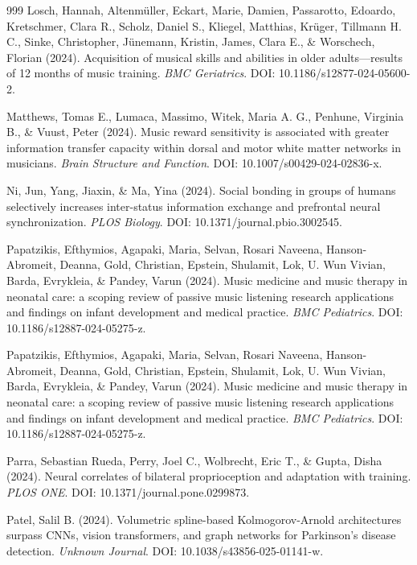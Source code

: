 \documentclass[9pt,onecolumn]{article}
\begin{document}
\begin{thebibliography}{999}
Losch, Hannah, Altenmüller, Eckart, Marie, Damien, Passarotto, Edoardo, Kretschmer, Clara R., Scholz, Daniel S., Kliegel, Matthias, Krüger, Tillmann H. C., Sinke, Christopher, Jünemann, Kristin, James, Clara E., \& Worschech, Florian (2024). Acquisition of musical skills and abilities in older adults—results of 12 months of music training. \textit{BMC Geriatrics}. DOI: 10.1186/s12877-024-05600-2.

Matthews, Tomas E., Lumaca, Massimo, Witek, Maria A. G., Penhune, Virginia B., \& Vuust, Peter (2024). Music reward sensitivity is associated with greater information transfer capacity within dorsal and motor white matter networks in musicians. \textit{Brain Structure and Function}. DOI: 10.1007/s00429-024-02836-x.

Ni, Jun, Yang, Jiaxin, \& Ma, Yina (2024). Social bonding in groups of humans selectively increases inter-status information exchange and prefrontal neural synchronization. \textit{PLOS Biology}. DOI: 10.1371/journal.pbio.3002545.

Papatzikis, Efthymios, Agapaki, Maria, Selvan, Rosari Naveena, Hanson-Abromeit, Deanna, Gold, Christian, Epstein, Shulamit, Lok, U. Wun Vivian, Barda, Evrykleia, \& Pandey, Varun (2024). Music medicine and music therapy in neonatal care: a scoping review of passive music listening research applications and findings on infant development and medical practice. \textit{BMC Pediatrics}. DOI: 10.1186/s12887-024-05275-z.

Papatzikis, Efthymios, Agapaki, Maria, Selvan, Rosari Naveena, Hanson-Abromeit, Deanna, Gold, Christian, Epstein, Shulamit, Lok, U. Wun Vivian, Barda, Evrykleia, \& Pandey, Varun (2024). Music medicine and music therapy in neonatal care: a scoping review of passive music listening research applications and findings on infant development and medical practice. \textit{BMC Pediatrics}. DOI: 10.1186/s12887-024-05275-z.

Parra, Sebastian Rueda, Perry, Joel C., Wolbrecht, Eric T., \& Gupta, Disha (2024). Neural correlates of bilateral proprioception and adaptation with training. \textit{PLOS ONE}. DOI: 10.1371/journal.pone.0299873.

Patel, Salil B. (2024). Volumetric spline-based Kolmogorov-Arnold architectures surpass CNNs, vision transformers, and graph networks for Parkinson's disease detection. \textit{Unknown Journal}. DOI: 10.1038/s43856-025-01141-w.


\end{thebibliography}
\end{document}
